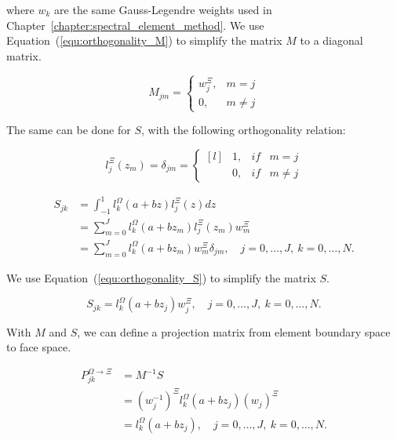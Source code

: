 \noindent
where \(w_k\) are the same Gauss-Legendre weights used in
Chapter~\ref{chapter:spectral_element_method}. We use Equation~(\ref{equ:orthogonality_M}) to
simplify the matrix \(M\) to a diagonal matrix.

\begin{equation}
    M_{jm} = \left \{ \begin{matrix}
    w_j^{\Xi }, &  m = j \\ 
    0, & m \neq  j
    \end{matrix}\right.
\end{equation}

\noindent
The same can be done for \(S\), with the following orthogonality relation:

\begin{equation} \label{equ:orthogonality_S}
    l_j ^ \Xi (z_m) = \delta_{jm} = \left \{ \begin{matrix*}[l]
    & 1, & if & m = j\\ 
    & 0, & if & m \neq j
    \end{matrix*}\right.
\end{equation}

\begin{equation} \label{equ:matrix_S}
    \begin{aligned}
        S_{jk} &= \int_{-1}^{1} l_k ^ \Omega \left( a + b z \right) l_j ^ \Xi \left( z \right) dz \\
        &= \sum_{m = 0}^{J} l_k ^ \Omega \left( a + b z_m \right) l_j ^ \Xi \left( z_m \right) w_m ^ \Xi \\
        &= \sum_{m = 0}^{J} l_k ^ \Omega \left( a + b z_m \right) w_m ^{\Xi} \delta_{jm}, \quad j = 0, \ldots, J, \: k = 0, \ldots, N.
    \end{aligned}
\end{equation}

\noindent
We use Equation~(\ref{equ:orthogonality_S}) to simplify the matrix \(S\).

\begin{equation}
    S_{jk} = l_k^{\Omega } \left( a + bz_j \right) w_j^{\Xi}, \quad j = 0, \ldots, J, \: k = 0, \ldots, N.
\end{equation}

With \(M\) and \(S\), we can define a projection matrix from element boundary space to face space.

\begin{equation}
    \begin{aligned}
        P_{jk} ^ {\Omega \rightarrow \Xi} &= M^{-1}S \\
        &= {\left( w_j ^{-1} \right)}^{\Xi }  l_k ^ \Omega \left( a + b z_j \right) {\left( w_j \right)}^{\Xi} \\
        &= l_k ^ \Omega \left(a + b z_j \right), \quad j = 0, \ldots, J, \: k = 0, \ldots, N.
    \end{aligned}
\end{equation}

